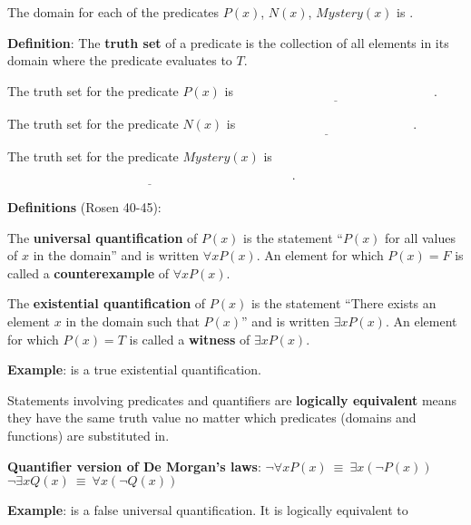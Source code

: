 \documentclass[12pt, oneside]{article}
\begin{document}
The domain for each of the predicates $P(x)$, $N(x)$, $Mystery(x)$ is
\underline{}.


{\bf Definition}: The {\bf truth  set} of a  predicate is the collection of all elements in its
domain where the predicate evaluates to $T$.

The truth set for the predicate $P(x)$ is $\underline{\phantom{\{ x ~\mid~ P(x) = T\} = \{ 001, 010, 011 \}}}$.

The truth set for the predicate $N(x)$ is $\underline{\phantom{\{ x ~\mid~ N(x) = T\} = \{ 101, 111 \}}}$.

The truth set for the predicate $Mystery(x)$ is $\underline{\phantom{\{ x ~\mid~ Mystery(x) = T\} = \{ 000, 001, 010, 101, 111 \}}}$.


\vfill


\newpage

{\bf Definitions} (Rosen 40-45): 

\vspace{-15pt}

The {\bf universal quantification} of $P(x)$ is the statement ``$P(x)$ for all values of $x$ in the domain''
and is written $\forall x P(x)$. An element for which $P(x) = F$ is called a {\bf counterexample} of $\forall x P(x)$.

The {\bf existential quantification} of $P(x)$ is the statement ``There exists an element $x$ in the domain such that $P(x)$'' and is written $\exists x P(x)$. An element for which $P(x) = T$ is called a {\bf witness} of $\exists x P(x)$.

{\bf Example}: 
\underline{\phantom{$\exists x ~(P(x) \to N(x))$}} is a true existential quantification.

Statements involving predicates and quantifiers are {\bf logically equivalent} 
means they have the same truth value no matter which predicates (domains and functions) are substituted in. 

{\bf Quantifier version of De Morgan's laws}: 
$\boxed{\neg \forall x P(x) ~\equiv~ \exists x \left( \neg P(x) \right)}$
\qquad
\qquad
$\boxed{\neg \exists x Q(x) ~\equiv~ \forall x \left( \neg Q(x) \right)}$


{\bf Example}: 
\underline{\phantom{$\forall x ~(P(x) \lor N(x))$}} is a false universal quantification. It is logically equivalent to \underline{\phantom{$\exists x ~\not (P(x) \lor N(x))$}}
\end{document}
